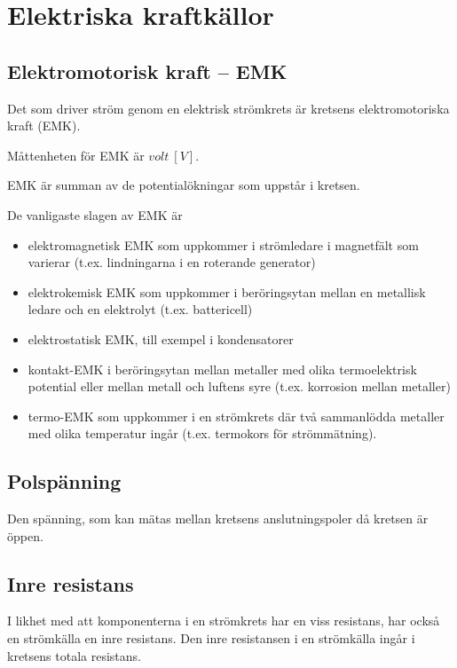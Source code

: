 \section{Elektriska kraftkällor}

\subsection{Elektromotorisk kraft -- EMK}

Det som driver ström genom en elektrisk strömkrets är kretsens elektromotoriska
kraft (EMK).

Måttenheten för EMK är \(volt\ [V]\).

EMK är summan av de potentialökningar som uppstår i kretsen.

De vanligaste slagen av EMK är
\begin{itemize}
\item elektromagnetisk EMK som uppkommer i strömledare i magnetfält som
varierar (t.ex. lindningarna i en roterande generator)
\item elektrokemisk EMK som uppkommer i beröringsytan mellan en metallisk
ledare och en elektrolyt (t.ex. battericell)
\item elektrostatisk EMK, till exempel i kondensatorer
\item kontakt-EMK i beröringsytan mellan metaller med olika termoelektrisk
potential eller mellan metall och luftens syre (t.ex. korrosion mellan metaller)
\item termo-EMK som uppkommer i en strömkrets där två sammanlödda metaller med
olika temperatur ingår (t.ex. termokors för strömmätning).
\end{itemize}

\subsection{Polspänning}

Den spänning, som kan mätas mellan kretsens anslutningspoler då kretsen är öppen.

\subsection{Inre resistans}

I likhet med att komponenterna i en strömkrets har en viss resistans, har också en
strömkälla en inre resistans.
Den inre resistansen i en strömkälla ingår i kretsens totala resistans.

